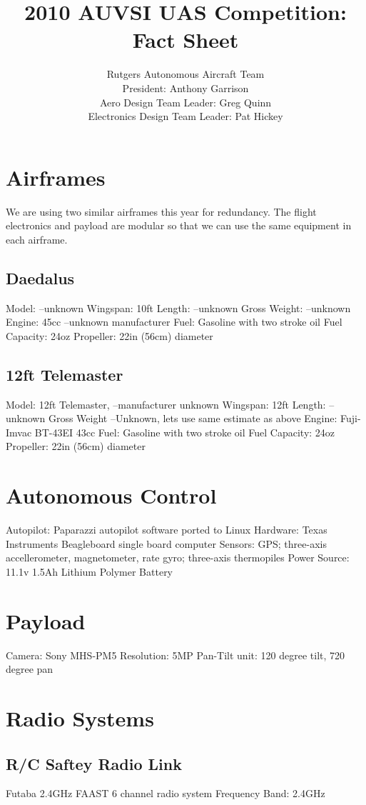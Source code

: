 \documentclass[12pt]{report}
\begin{document}
\title{2010 AUVSI UAS Competition: Fact Sheet}
\author{Rutgers Autonomous Aircraft Team
\\President: Anthony Garrison
\\Aero Design Team Leader: Greg Quinn
\\Electronics Design Team Leader: Pat Hickey}


\section{Airframes}
We are using two similar airframes this year for redundancy. The flight electronics and payload are modular so that we can use the same equipment in each airframe.
\subsection{Daedalus}
Model: --unknown
Wingspan: 10ft
Length: --unknown
Gross Weight: --unknown
Engine: 45cc --unknown manufacturer
Fuel: Gasoline with two stroke oil
Fuel Capacity: 24oz
Propeller: 22in (56cm) diameter
\subsection{12ft Telemaster}
Model: 12ft Telemaster, --manufacturer unknown
Wingspan: 12ft
Length: --unknown
Gross Weight --Unknown, lets use same estimate as above
Engine: Fuji-Imvac BT-43EI 43cc
Fuel: Gasoline with two stroke oil
Fuel Capacity: 24oz
Propeller: 22in (56cm) diameter

\section{Autonomous Control}
Autopilot: Paparazzi autopilot software ported to Linux
Hardware: Texas Instruments Beagleboard single board computer
Sensors: GPS; three-axis accellerometer, magnetometer, rate gyro; three-axis thermopiles
Power Source: 11.1v 1.5Ah Lithium Polymer Battery

\section{Payload}
Camera: Sony MHS-PM5
Resolution: 5MP
Pan-Tilt unit: 120 degree tilt, 720 degree pan

\section{Radio Systems}
\subsection{R/C Saftey Radio Link}
Futaba 2.4GHz FAAST 6 channel radio system
Frequency Band: 2.4GHz
\end{document}
